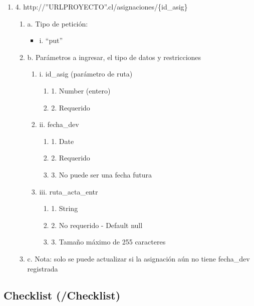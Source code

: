 \begin{enumerate}
    \item 4. http://”URLPROYECTO”.cl/asignaciones/\{id\_asig\}
    \begin{enumerate}
        \item a. Tipo de petición:
            \begin{itemize}
               \item i. “put”
            \end{itemize}
        \item b. Parámetros a ingresar, el tipo de datos y restricciones
            \begin{enumerate}
                \item i. id\_asig (parámetro de ruta)
                    \begin{enumerate}
                        \item 1. Number (entero)
                        \item 2. Requerido
                    \end{enumerate}
                \item ii. fecha\_dev
                    \begin{enumerate}
                        \item 1. Date
                        \item 2. Requerido
                        \item 3. No puede ser una fecha futura
                    \end{enumerate}
                \item iii. ruta\_acta\_entr
                    \begin{enumerate}
                        \item 1. String
                        \item 2. No requerido - Default null
                        \item 3. Tamaño máximo de 255 caracteres
                    \end{enumerate}
            \end{enumerate}
        \item c. Nota: solo se puede actualizar si la asignación aún no tiene fecha\_dev registrada
    \end{enumerate}
\end{enumerate}

\subsection{Checklist (/Checklist)}

